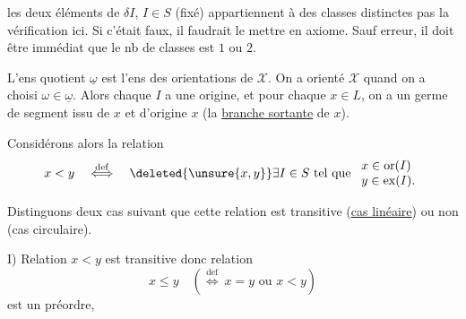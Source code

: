 
les deux éléments de $\delta I$, $I\in S$ (fixé) appartiennent à des classes distinctes 
 pas la vérification ici. Si c'était faux, il faudrait le mettre en axiome. Sauf erreur, il doit être immédiat que  le nb de classes est $1$ ou $2$.


L'ens quotient $\underline{\omega}$ est l'ens des orientations de $\mathcal X$.  On a orienté $\mathcal X$ quand on a choisi $\omega\in\underline{\omega}$. Alors chaque $I$ a une origine, et pour chaque $x\in L$, on a un germe de segment  issu de $x$ et d'origine $x$ (la \uline{branche sortante} de $x$).

Considérons alors la relation
\[
x<y\quad\overset{\mathrm{def}}{\Longleftrightarrow}\quad
\deleted{\unsure{x,y}}
\exists I\in S\text{ tel que }
\begin{array}{l}
x\in\operatorname{or}(I)\\
y\in\operatorname{ex}(I).
\end{array}
\]

Distinguons deux cas suivant que cette relation est transitive (\uline{cas linéaire}) ou non (cas circulaire).

I) Relation $x<y$ est transitive donc relation
\[
x\leq y\quad(\overset{\mathrm{def}}{\Longleftrightarrow}\ x=y\text{ ou }x<y)
\]
est un préordre,


